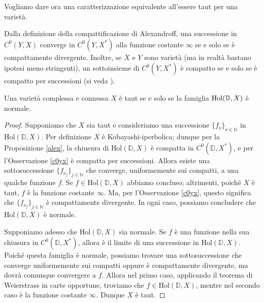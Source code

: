 Vogliamo dare ora una caratterizzazione equivalente all'essere taut per una varietà.

\begin{oss} \label{c0yx}
    Dalla definizione della compattificazione di Alexandroff, una successione in $C^0(Y,X)$ converge in $C^0(Y,X^*)$ alla funzione costante $\infty$ se e solo se è compattamente divergente. Inoltre, se $X$ e $Y$ sono varietà (ma in realtà bastano ipotesi meno stringenti), un sottoinsieme di $C^0(Y,X^*)$ è compatto se e solo se è compatto per successioni (si veda \cite[Section 1]{A3}).
\end{oss}

\begin{prop}
    Una varietà complessa e connessa $X$ è taut se e solo se la famiglia $\textnormal{Hol}(\mathbb{D},X)$ è normale.
\end{prop}
\begin{proof}
    Supponiamo che $X$ sia taut e consideriamo una successione $\{f_{\nu}\}_{\nu\in\mathbb{N}}$ in $\text{Hol}(\mathbb{D},X)$. Per definizione $X$ è Kobayashi-iperbolica; dunque per la Proposizione \ref{alex}, la chiusura di $\text{Hol}(\mathbb{D},X)$ è compatta in $C^0(\mathbb{D},X^*)$, e per l'Osservazione \ref{c0yx} è compatta per successioni. Allora esiste una sottosuccessione $\{f_{\nu_j}\}_{j \in \mathbb{N}}$ che converge, uniformemente sui compatti, a una qualche funzione $f$. Se $f \in \text{Hol}(\mathbb{D},X)$ abbiamo concluso; altrimenti, poiché $X$ è taut, $f$ è la funzione costante $\infty$. Ma, per l'Osservazione \ref{c0yx}, questo significa che $\{f_{\nu_j}\}_{j \in \mathbb{N}}$ è compattamente divergente. In ogni caso, possiamo concludere che $\text{Hol}(\mathbb{D},X)$ è normale.

    Supponiamo adesso che $\text{Hol}(\mathbb{D},X)$ sia normale. Se $f$ è una funzione nella sua chiusura in $C^0(\mathbb{D},X^*)$, allora è il limite di una successione in $\text{Hol}(\mathbb{D},X)$. Poiché questa famiglia è normale, possiamo trovare una sottosuccessione che converge uniformemente sui compatti oppure è compattamente divergente, ma dovrà comunque convergere a $f$. Allora nel primo caso, applicando il teorema di Weierstrass in carte opportune, troviamo che $f \in \text{Hol}(\mathbb{D},X)$, mentre nel secondo caso è la funzione costante $\infty$. Dunque $X$ è taut.
\end{proof}


